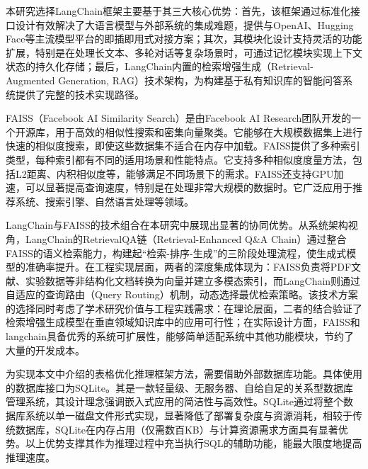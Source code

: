 本研究选择LangChain框架主要基于其三大核心优势：首先，该框架通过标准化接口设计有效解决了大语言模型与外部系统的集成难题，提供与OpenAI、Hugging Face等主流模型平台的即插即用式对接方案；其次，其模块化设计支持灵活的功能扩展，特别是在处理长文本、多轮对话等复杂场景时，可通过记忆模块实现上下文状态的持久化存储；最后，LangChain内置的检索增强生成（Retrieval-Augmented Generation, RAG）技术架构，为构建基于私有知识库的智能问答系统提供了完整的技术实现路径。

FAISS\cite{johnson2019billion}（Facebook AI Similarity Search）是由Facebook AI Research团队开发的一个开源库，用于高效的相似性搜索和密集向量聚类。它能够在大规模数据集上进行快速的相似度搜索，即使这些数据集不适合在内存中加载。FAISS提供了多种索引类型，每种索引都有不同的适用场景和性能特点。它支持多种相似度度量方法，包括L2距离、内积相似度等，能够满足不同场景下的需求。FAISS还支持GPU加速，可以显著提高查询速度，特别是在处理非常大规模的数据时。它广泛应用于推荐系统、搜索引擎、自然语言处理等领域。

LangChain与FAISS的技术组合在本研究中展现出显著的协同优势。从系统架构视角，LangChain的RetrievalQA链（Retrieval-Enhanced Q\&A Chain）通过整合FAISS的语义检索能力，构建起“检索-排序-生成”的三阶段处理流程，使生成式模型的准确率提升。在工程实现层面，两者的深度集成体现为：FAISS负责将PDF文献、实验数据等非结构化文档转换为向量并建立多模态索引，而LangChain则通过自适应的查询路由（Query Routing）机制，动态选择最优检索策略。该技术方案的选择同时考虑了学术研究价值与工程实践需求：在理论层面，二者的结合验证了检索增强生成模型在垂直领域知识库中的应用可行性；在实际设计方面，FAISS和langchain具备优秀的系统可扩展性，能够简单适配系统中其他功能模块，节约了大量的开发成本。

为实现本文中介绍的表格优化推理框架方法，需要借助外部数据库功能。具体使用的数据库接口为SQLite。其是一款轻量级、无服务器、自给自足的关系型数据库管理系统，其设计理念强调嵌入式应用的简洁性与高效性。SQLite通过将整个数据库系统以单一磁盘文件形式实现，显著降低了部署复杂度与资源消耗，相较于传统数据库，SQLite在内存占用（仅需数百KB）与计算资源需求方面具有显著优势。以上优势支撑其作为推理过程中充当执行SQL的辅助功能，能最大限度地提高推理速度。

